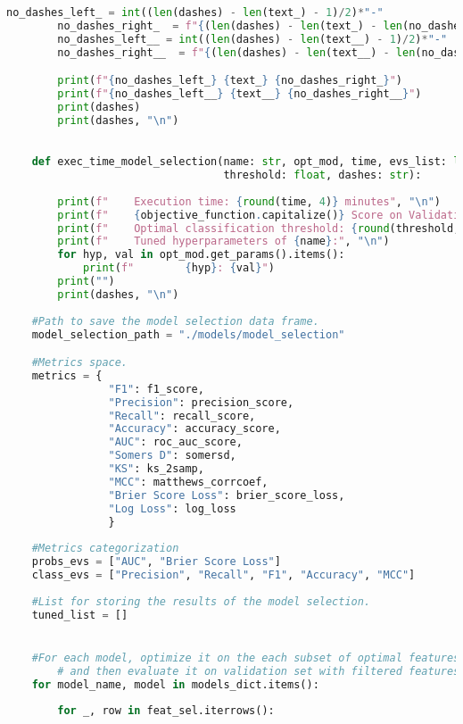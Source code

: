 \begin{lstlisting}[language=Python, basicstyle=\footnotesize\ttfamily]
        no_dashes_left_ = int((len(dashes) - len(text_) - 1)/2)*"-"
        no_dashes_right_  = f"{(len(dashes) - len(text_) - len(no_dashes_left_) - 2)*'-'}"
        no_dashes_left__ = int((len(dashes) - len(text__) - 1)/2)*"-"
        no_dashes_right__  = f"{(len(dashes) - len(text__) - len(no_dashes_left__) - 2)*'-'}"     

        print(f"{no_dashes_left_} {text_} {no_dashes_right_}")
        print(f"{no_dashes_left__} {text__} {no_dashes_right__}")
        print(dashes)
        print(dashes, "\n")
    

    def exec_time_model_selection(name: str, opt_mod, time, evs_list: list,
                                  threshold: float, dashes: str):
        
        print(f"    Execution time: {round(time, 4)} minutes", "\n")
        print(f"    {objective_function.capitalize()} Score on Validation set: {evs_list[0]}", "\n")
        print(f"    Optimal classification threshold: {round(threshold, 4)}", "\n")
        print(f"    Tuned hyperparameters of {name}:", "\n")
        for hyp, val in opt_mod.get_params().items():
            print(f"        {hyp}: {val}")
        print("")
        print(dashes, "\n")
    
    #Path to save the model selection data frame.
    model_selection_path = "./models/model_selection"

    #Metrics space.
    metrics = { 
                "F1": f1_score,
                "Precision": precision_score, 
                "Recall": recall_score, 
                "Accuracy": accuracy_score,
                "AUC": roc_auc_score,
                "Somers D": somersd,
                "KS": ks_2samp, 
                "MCC": matthews_corrcoef,
                "Brier Score Loss": brier_score_loss,
                "Log Loss": log_loss
                }
    
    #Metrics categorization
    probs_evs = ["AUC", "Brier Score Loss"]
    class_evs = ["Precision", "Recall", "F1", "Accuracy", "MCC"]
    
    #List for storing the results of the model selection.
    tuned_list = []


    #For each model, optimize it on the each subset of optimal features on training set
        # and then evaluate it on validation set with filtered features (using set of several metrics).
    for model_name, model in models_dict.items():
        
        for _, row in feat_sel.iterrows():
            

\end{lstlisting}
